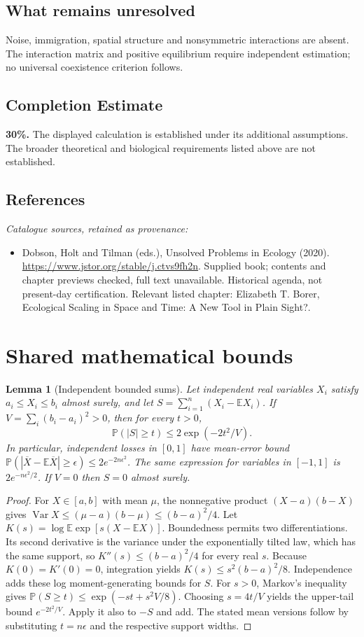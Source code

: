 \documentclass[11pt]{article}
\newcommand{\E}{\mathbb E}
\newcommand{\Prob}{\mathbb P}
\DeclareMathOperator{\Var}{Var}
\providecommand{\E}{\mathbb E}
\providecommand{\Prob}{\mathbb P}
\providecommand{\Var}{\operatorname{Var}}
\newtheorem{sharedlemma}{Lemma}[section]
\begin{document}
\subsection{What remains unresolved}
Noise, immigration, spatial structure and nonsymmetric interactions are absent. The interaction matrix and positive equilibrium require independent estimation; no universal coexistence criterion follows.
\subsection{Completion Estimate}
\textbf{30\%.} The displayed calculation is established under its additional assumptions. The broader theoretical and biological requirements listed above are not established.
\subsection{References}
\noindent\emph{Catalogue sources, retained as provenance:}
\begin{itemize}
\item Dobson, Holt and Tilman (eds.), Unsolved Problems in Ecology (2020). \url{https://www.jstor.org/stable/j.ctvs9fh2n}. Supplied book; contents and chapter previews checked, full text unavailable. Historical agenda, not present-day certification. Relevant listed chapter: Elizabeth T. Borer, Ecological Scaling in Space and Time: A New Tool in Plain Sight?.
\end{itemize}
\clearpage


\appendix
\section{Shared mathematical bounds}\label{app:bounds}
\begin{sharedlemma}[Independent bounded sums]\label{lem:bounded}
Let independent real variables $X_i$ satisfy $a_i\leq X_i\leq b_i$ almost surely,
and let $S=\sum_{i=1}^n(X_i-\E X_i)$. If
$V=\sum_i(b_i-a_i)^2>0$, then for every $t>0$,
\[
 \Prob(|S|\geq t)\leq 2\exp(-2t^2/V).
\]
In particular, independent losses in $[0,1]$ have mean-error bound
$\Prob(|\overline X-\E\overline X|\geq\epsilon)
\leq2e^{-2n\epsilon^2}$. The same expression for variables in $[-1,1]$
is $2e^{-n\epsilon^2/2}$. If $V=0$ then $S=0$ almost surely.
\end{sharedlemma}
\begin{proof}
For $X\in[a,b]$ with mean $\mu$, the nonnegative product
$(X-a)(b-X)$ gives
$\Var X\leq(\mu-a)(b-\mu)\leq(b-a)^2/4$.
Let $K(s)=\log\E\exp[s(X-\E X)]$.
Boundedness permits two differentiations. Its second derivative is the variance
under the exponentially tilted law, which has the same support, so
$K''(s)\leq(b-a)^2/4$ for every real $s$.
Because $K(0)=K'(0)=0$, integration yields
$K(s)\leq s^2(b-a)^2/8$.
Independence adds these log moment-generating bounds for $S$.
For $s>0$, Markov's inequality gives
$\Prob(S\geq t)\leq\exp(-st+s^2V/8)$.
Choosing $s=4t/V$ yields the upper-tail bound $e^{-2t^2/V}$.
Apply it also to $-S$ and add. The stated mean versions follow by substituting
$t=n\epsilon$ and the respective support widths.
\end{proof}
\end{document}

